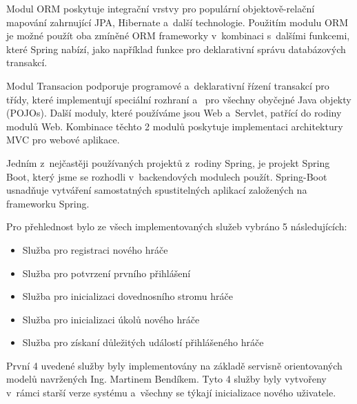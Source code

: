 \documentclass[12pt]{article}
\begin{document}
Modul ORM poskytuje integrační vrstvy pro populární objektově-relační mapování
zahrnující JPA, Hibernate a~další technologie.
Použitím modulu ORM je možné použít oba zmíněné ORM frameworky 
v~kombinaci s~dalšími funkcemi, které Spring nabízí, 
jako například funkce pro deklarativní správu databázových transakcí.

Modul Transacion podporuje programové a~deklarativní řízení
transakcí pro třídy, které implementují speciální rozhraní a~
pro všechny obyčejné Java objekty (POJOs).
Další moduly, které používáme jsou Web a~Servlet, patřící do rodiny modulů Web.
Kombinace těchto 2 modulů poskytuje implementaci architektury MVC
pro webové aplikace. 


Jedním z~nejčastěji používaných projektů z~rodiny Spring,
je projekt Spring Boot, který jsme se rozhodli v~backendových modulech použít.
Spring-Boot usnadňuje vytváření samostatných spustitelných aplikací
založených na frameworku Spring.





Pro přehlednost bylo ze všech implementovaných služeb vybráno 5 následujících:

\begin{itemize}
\item Služba pro registraci nového hráče
\item Služba pro potvrzení prvního přihlášení
\item Služba pro inicializaci dovednosního stromu hráče
\item Služba pro inicializaci úkolů nového hráče
\item Služba pro získaní důležitých událostí přihlášeného hráče
\end{itemize}

První 4 uvedené služby byly implementovány na základě servisně orientovaných modelů navržených Ing. Martinem Bendíkem.
Tyto 4 služby byly vytvořeny v~rámci starší verze systému a~všechny se týkají inicializace nového uživatele.
\end{document}
